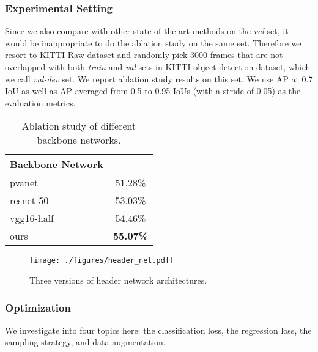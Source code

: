 \vspace{-0.2cm}
\subsubsection{Experimental Setting}

Since we also compare with other state-of-the-art methods on the {\it val} set, it would be inappropriate to do the ablation study on the same set. Therefore we resort to KITTI Raw dataset \cite{kitti-raw} and randomly pick 3000 frames that are not overlapped with both {\it train} and {\it val} sets in KITTI object detection dataset, which we call {\it val-dev} set. We report ablation study results on this set. We use AP at 0.7 IoU as well as AP averaged from 0.5 to 0.95 IoUs (with a stride of 0.05) as the evaluation metrics.

\begin{table}[t]
\begin{center}
\begin{small}
\begin{tabular}{|l|c|}
\hline
Backbone Network &  \\
\hline
pvanet & 51.28\% \\
resnet-50 & 53.03\% \\
vgg16-half & 54.46\% \\
ours & {\bf 55.07\%} \\
\hline
\end{tabular}
\caption{Ablation study of different backbone networks.}
\label{tab:backbone_exp}
\end{small}
\end{center}
\vspace{-0.5cm}
\end{table}
\begin{figure}[t]
\begin{center}
   \texttt{[image: ./figures/header\_net.pdf]}
\caption{Three versions of header network architectures.}
\label{fig:subnet}
\end{center}
\vspace{-0.5cm}
\end{figure}


\vspace{-0.2cm}
\subsubsection{Optimization}

We investigate into four topics here: the classification loss, the regression loss, the sampling strategy, and data augmentation.

